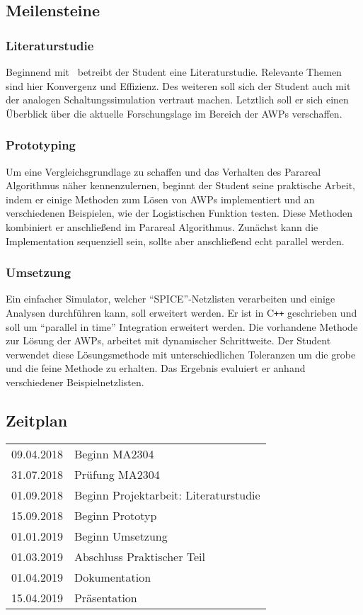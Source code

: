 \documentclass[12pt,a4paper]{article}
\begin{document}
\subsection*{Meilensteine}
\subsubsection*{Literaturstudie}
Beginnend mit~\cite{Gander:2015} betreibt der Student eine Literaturstudie. Relevante Themen sind hier Konvergenz und Effizienz. Des weiteren soll sich der Student auch mit der analogen Schaltungssimulation vertraut machen. Letztlich soll er sich einen Überblick über die aktuelle Forschungslage im Bereich der AWPs verschaffen.
\subsubsection*{Prototyping}
Um eine Vergleichsgrundlage zu schaffen und das Verhalten des Parareal Algorithmus näher kennenzulernen, beginnt der Student seine praktische Arbeit, indem er einige Methoden zum Lösen von AWPs implementiert und an verschiedenen Beispielen, wie der Logistischen Funktion testen. Diese Methoden kombiniert er anschließend im Parareal Algorithmus. Zunächst kann die Implementation sequenziell sein, sollte aber anschließend echt parallel werden.
\subsubsection*{Umsetzung}
Ein einfacher Simulator, welcher "`SPICE"'-Netzlisten verarbeiten und einige Analysen durchführen kann, soll erweitert werden. Er ist in C\texttt{++} geschrieben und soll um "`parallel in time"' Integration erweitert werden. Die vorhandene Methode zur Lösung der AWPs, arbeitet mit dynamischer Schrittweite. Der Student verwendet diese Lösungsmethode mit unterschiedlichen Toleranzen um die grobe und die feine Methode zu erhalten. Das Ergebnis evaluiert er anhand verschiedener Beispielnetzlisten.

\subsection*{Zeitplan}

\begin{tabular}{ r l }
    09.04.2018 & Beginn MA2304\\
    31.07.2018 & Prüfung MA2304\\
    01.09.2018 & Beginn Projektarbeit: Literaturstudie\\
    15.09.2018 & Beginn Prototyp\\
    01.01.2019 & Beginn Umsetzung\\
    01.03.2019 & Abschluss Praktischer Teil\\
    01.04.2019 & Dokumentation\\
    15.04.2019 & Präsentation\\
  \end{tabular}
\end{document}
